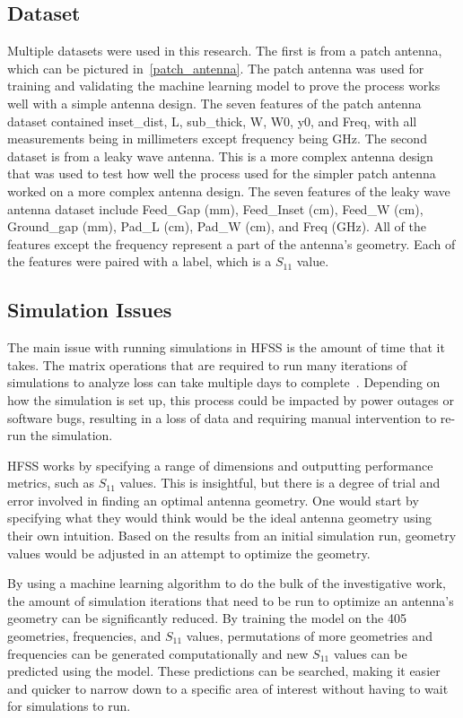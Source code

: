\documentclass[lettersize,journal]{IEEEtran}
\begin{document}
\subsection{Dataset}
Multiple datasets were used in this research. The first is from a patch antenna, which can be pictured in~\ref{patch_antenna}. The patch antenna was used for training and validating the machine learning model to prove the process works well with a simple antenna design. The seven features of the patch antenna dataset contained inset\_dist, L, sub\_thick, W, W0, y0, and Freq, with all measurements being in millimeters except frequency being GHz. The second dataset is from a leaky wave antenna. This is a more complex antenna design that was used to test how well the process used for the simpler patch antenna worked on a more complex antenna design. The seven features of the leaky wave antenna dataset include Feed\_Gap (mm), Feed\_Inset (cm), Feed\_W (cm), Ground\_gap (mm), Pad\_L (cm), Pad\_W (cm), and Freq (GHz). All of the features except the frequency represent a part of the antenna's geometry. Each of the features were paired with a label, which is a $S_{11}$ value.

\subsection{Simulation Issues}
The main issue with running simulations in HFSS is the amount of time that it takes. The matrix operations that are required to run many iterations of simulations to analyze loss can take multiple days to complete~\cite{john_antenna_2009,liu_efficient_2014}. Depending on how the simulation is set up, this process could be impacted by power outages or software bugs, resulting in a loss of data and requiring manual intervention to re-run the simulation. 

HFSS works by specifying a range of dimensions and outputting performance metrics, such as $S_{11}$ values. This is insightful, but there is a degree of trial and error involved in finding an optimal antenna geometry. One would start by specifying what they would think would be the ideal antenna geometry using their own intuition. Based on the results from an initial simulation run, geometry values would be adjusted in an attempt to optimize the geometry.

By using a machine learning algorithm to do the bulk of the investigative work, the amount of simulation iterations that need to be run to optimize an antenna's geometry can be significantly reduced. By training the model on the 405 geometries, frequencies, and $S_{11}$ values, permutations of more geometries and frequencies can be generated computationally and new $S_{11}$ values can be predicted using the model. These predictions can be searched, making it easier and quicker to narrow down to a specific area of interest without having to wait for simulations to run.
\end{document}
